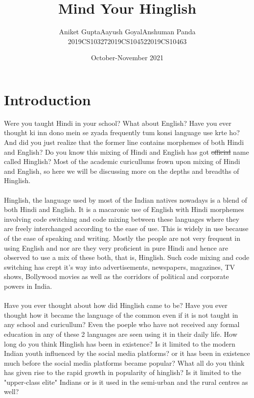 \documentclass{article}
\title{Mind Your Hinglish}
\author{\hspace{0.55cm}Aniket Gupta\hspace{2cm}Aayush Goyal\hspace{2cm}Anshuman Panda\\2019CS10327\hspace{2.2cm}2019CS10452\hspace{2.4cm}2019CS10463}
\date{October-November 2021}
\begin{document}
\maketitle

\section{Introduction}
Were you taught Hindi in your school? What about English? Have you ever thought ki inn dono mein se zyada frequently tum konsi language use krte ho? And did you just realize that the former line contains morphemes of both Hindi and English? Do you know this mixing of Hindi and English has got \sout{official} name called Hinglish? Most of the academic curicullums frown upon mixing of Hindi and English, so here we will be discussing more on the depths and breadths of Hinglish.
\\\\
Hinglish, the language used by most of the Indian natives nowadays is a blend of both Hindi and English. It is a macaronic use of English with Hindi morphemes involving code switching and code mixing between these languages where they are freely interchanged according to the ease of use. This is widely in use because of the ease of speaking and writing. Mostly the people are not very frequent in using English and nor are they very proficient in pure Hindi and hence are observed to use a mix of these both, that is, Hinglish. Such code mixing and code switching has crept it's way into advertisements, newspapers, magazines, TV shows, Bollywood movies as well as the corridors of political and corporate powers in India. 
\\\\
Have you ever thought about how did Hinglish came to be? Have you ever thought how it became the language of the common even if it is not taught in any school and curicullum? Even the poeple who have not received any formal education in any of these 2 languages are seen using it in their daily life. How long do you think Hinglish has been in existence? Is it limited to the modern Indian youth influenced by the social media platforms? or it has been in existence much before the social media platforms became popular? What all do you think has given rise to the rapid growth in popularity of hinglish? Is it limited to the "upper-class elite" Indians or is it used in the semi-urban and the rural centres as well? 
\end{document}
